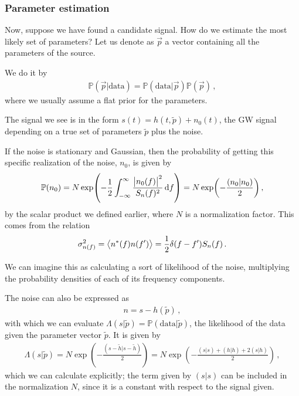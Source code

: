 \documentclass[main.tex]{subfiles}
\begin{document}
\subsubsection{Parameter estimation}


Now, suppose we have found a candidate signal. How do we estimate the most likely set of parameters?
Let us denote as \(\vec{p}\) a vector containing all the parameters of the source.

We do it by 
%
\begin{align}
\mathbb{P}(\vec{p} | \text{data}) = \mathbb{P} (\text{data} | \vec{p}) \mathbb{P} (\vec{p})
\,,
\end{align}
%
where we usually assume a flat prior for the parameters.

The signal we see is in the form \(s(t) = h (t, \widetilde{p}) + n_0 (t)\), the GW signal depending on a true set of parameters \(\widetilde{p}\) plus the noise. 

If the noise is stationary and Gaussian, then the probability of getting this specific realization of the noise, \(n_0 \), is given by
%
\begin{align}
\mathbb{P}(n_0 ) = N \exp( - \frac{1}{2} \int_{- \infty }^{ \infty } \frac{\abs{n_0 (f)}^2}{S_n(f)^2} \dd{f}) = N \exp( -\frac{(n_0 | n_0 )}{2})
\,,
\end{align}
%
by the scalar product we defined earlier, where \(N\) is a normalization factor. 
This comes from the relation 
%
\begin{align}
\sigma^2_{n(f)} = \expval{n^{*}(f) n(f')} = \frac{1}{2} \delta (f - f') S_n (f)
\,.
\end{align}

We can imagine this as calculating a sort of likelihood of the noise, multiplying the probability densities of each of its frequency components.

The noise can also be expressed as
%
\begin{align}
n = s - h (\widetilde{p}) 
\,,
\end{align}
%
with which we can evaluate \(\Lambda (s | \widetilde{p}) = \mathbb{P}(\text{data} | \widetilde{p})\), the likelihood of the data given the parameter vector \(\widetilde{p}\).  
It is given by
%
\begin{align}
\Lambda (s| \widetilde{p})
= N \exp( -\frac{(s - \widetilde{h} | s - \widetilde{h})}{2})
= N \exp(- \frac{(s | s) + (h | h) + 2 (s | h)}{2})
\,,
\end{align}
%
which we can calculate explicitly;
the term given by \((s | s)\) can be included in the normalization \(N\), since it is a constant with respect to the signal given.
\end{document}
